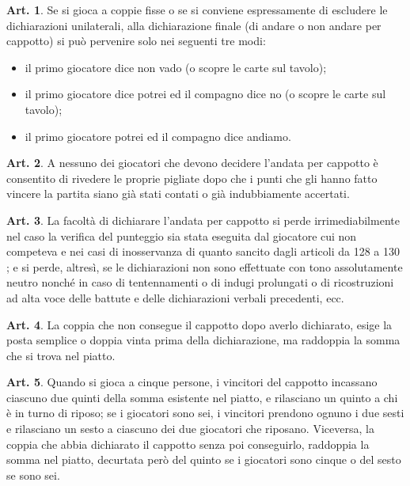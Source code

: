 \documentclass[italian,a4paper]{article}
\theoremstyle{definition}
\newtheorem{art}{Art.}
\begin{document}
\begin{art}
Se si gioca a coppie fisse o se si conviene espressamente di escludere le dichiarazioni unilaterali, alla dichiarazione finale  (di andare o non andare per cappotto) si può pervenire solo nei seguenti tre modi:
\begin{itemize}
\item    il primo giocatore dice non vado (o scopre le carte sul tavolo);
\item    il primo giocatore dice potrei ed il compagno dice no  (o scopre le carte sul tavolo);
\item    il primo giocatore potrei ed il compagno dice andiamo.
    \end{itemize}
\end{art}
\begin{art}
A nessuno dei giocatori che devono decidere l'andata per cappotto è consentito di rivedere le proprie pigliate dopo che i punti che gli hanno fatto vincere la partita siano già stati contati o già indubbiamente accertati.
\end{art}
\begin{art}
La facoltà di dichiarare l'andata per cappotto si perde irrimediabilmente nel caso la verifica del punteggio sia stata eseguita dal giocatore cui non competeva e nei casi di inosservanza di quanto sancito dagli articoli da 128 a 130 ;  e si perde, altresì, se le dichiarazioni non sono effettuate con tono assolutamente neutro nonché in caso di tentennamenti o di indugi prolungati o di  ricostruzioni ad alta voce delle battute e delle dichiarazioni verbali precedenti, ecc.
\end{art}
\begin{art}
La coppia che non consegue il cappotto dopo averlo dichiarato, esige la posta semplice o doppia vinta prima della dichiarazione, ma raddoppia la somma che si trova nel piatto.
\end{art}
\begin{art}
Quando si gioca a cinque persone, i vincitori del cappotto incassano ciascuno due quinti della somma esistente nel piatto, e rilasciano un quinto a chi è in turno di riposo; se i giocatori sono sei, i vincitori prendono ognuno i due sesti e rilasciano un sesto a ciascuno dei due giocatori che riposano. Viceversa, la coppia che abbia dichiarato il cappotto senza poi conseguirlo, raddoppia la somma nel piatto, decurtata però del quinto se i giocatori sono cinque o del sesto se sono sei.
\end{art}
\end{document}
